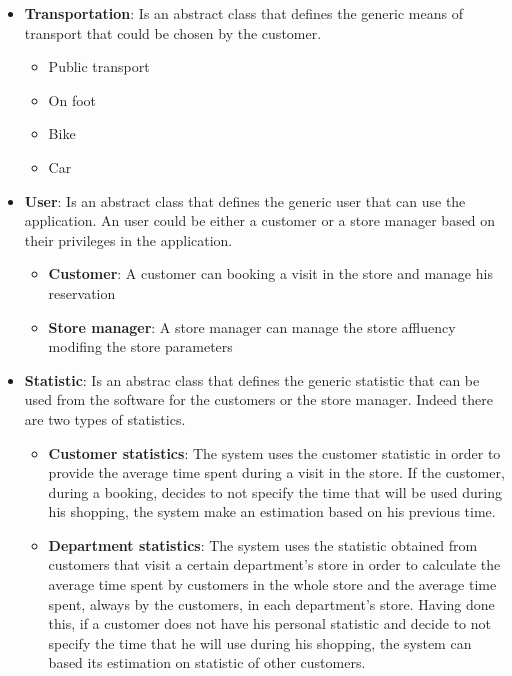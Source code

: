 \documentclass{article}
\begin{document}
			\begin{itemize}
				\item {\bfseries Transportation}: Is an abstract class that defines the generic means of transport that could be chosen by the customer.
				
					\begin{itemize}
						\item Public transport
						\item On foot
						\item Bike
						\item Car
					\end{itemize}
				
				\item {\bfseries User}: Is an abstract class that defines the generic user that can use the application. An user could be either a customer or a store manager based on their privileges in the application.
				
					\begin{itemize}
						\item {\bfseries Customer}: A customer can booking a visit in the store and manage his reservation 
						
						\item {\bfseries Store manager}: A store manager can manage the store affluency modifing the store parameters
					\end{itemize}
				
				\item {\bfseries Statistic}: Is an abstrac class that defines the generic statistic that can be used from the software for the customers or the store manager. Indeed there are two types of statistics.
				
				\begin{itemize}
					\item {\bfseries Customer statistics}: The system uses the customer statistic in order to provide the average time spent during a visit in the store. If the customer, during a booking, decides to not specify the time that will be used during his shopping, the system make an estimation based on his previous time.
					
					\item {\bfseries Department statistics}: The system uses the statistic obtained from customers that visit a certain department's store in order to calculate the average time spent by customers in the whole store and the average time spent, always by the customers, in each department's store. Having done this, if a customer does not have his personal statistic and decide to not specify the time that he will use during his shopping, the system can based its estimation on statistic of other customers.
				

\end{itemize}
\end{itemize}
\end{document}
